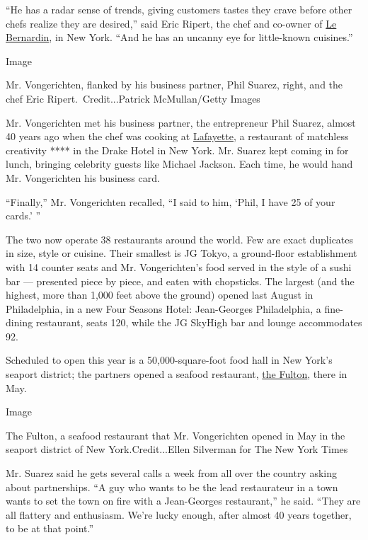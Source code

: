 ``He has a radar sense of trends, giving customers tastes they crave
before other chefs realize they are desired,'' said Eric Ripert, the
chef and co-owner of
\href{https://www.nytimes3xbfgragh.onion/2012/05/23/dining/reviews/le-bernardin-in-midtown-manhattan.html}{Le
Bernardin}, in New York. ``And he has an uncanny eye for little-known
cuisines.''

Image

Mr. Vongerichten, flanked by his business partner, Phil Suarez, right,
and the chef Eric Ripert.~Credit...Patrick McMullan/Getty Images

Mr. Vongerichten met his business partner, the entrepreneur Phil Suarez,
almost 40 years ago when the chef was cooking at
\href{https://www.nytimes3xbfgragh.onion/1988/04/22/arts/restaurants-067888.html}{Lafayette},
a restaurant of matchless creativity **** in the Drake Hotel in New
York. Mr. Suarez kept coming in for lunch, bringing celebrity guests
like Michael Jackson. Each time, he would hand Mr. Vongerichten his
business card.

``Finally,'' Mr. Vongerichten recalled, ``I said to him, `Phil, I have
25 of your cards.' ''

The two now operate 38 restaurants around the world. Few are exact
duplicates in size, style or cuisine. Their smallest is JG Tokyo, a
ground-floor establishment with 14 counter seats and Mr. Vongerichten's
food served in the style of a sushi bar --- presented piece by piece,
and eaten with chopsticks. The largest (and the highest, more than 1,000
feet above the ground) opened last August in Philadelphia, in a new Four
Seasons Hotel: Jean-Georges Philadelphia, a fine-dining restaurant,
seats 120, while the JG SkyHigh bar and lounge accommodates 92.

Scheduled to open this year is a 50,000-square-foot food hall in New
York's seaport district; the partners opened a seafood restaurant,
\href{https://www.nytimes3xbfgragh.onion/2019/07/30/dining/the-fulton-review-pete-wells-jean-georges.html}{the
Fulton}, there in May.

Image

The Fulton, a seafood restaurant that Mr. Vongerichten opened in May in
the seaport district of New York.Credit...Ellen Silverman for The New
York Times

Mr. Suarez said he gets several calls a week from all over the country
asking about partnerships. ``A guy who wants to be the lead restaurateur
in a town wants to set the town on fire with a Jean-Georges
restaurant,'' he said. ``They are all flattery and enthusiasm. We're
lucky enough, after almost 40 years together, to be at that point.''

